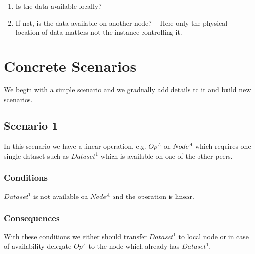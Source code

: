 \begin{enumerate}
\item Is the data available locally?
\item If not, is the data available on another node? -- Here only the physical location of data matters not the instance
controlling it.
\end{enumerate}





\section{Concrete Scenarios}
We begin with a simple scenario and we gradually add details to it and build new scenarios.

\subsection{Scenario 1}
In this scenario we have a linear operation, e.g. \(Op^A\) on \(Node^A\) which
requires one single dataset such as \( Dataset^1 \) which is available on one of the other peers.

\subsubsection{Conditions} \( Dataset^1 \) is not available on \( Node^A \) and the operation is linear.
\subsubsection{Consequences} With these conditions we either should transfer \( Dataset^1 \)
to local node or in case of availability delegate \(Op^A\) to the node which already has \( Dataset^1 \).

